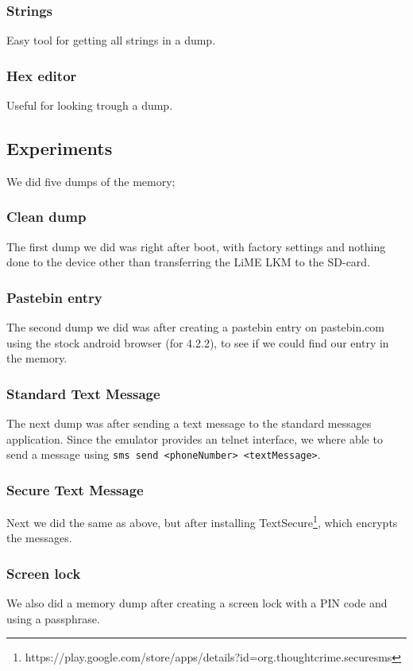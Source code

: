  \subsubsection{Strings}
  Easy tool for getting all strings in a dump.
  \subsubsection{Hex editor}
  Useful for looking trough a dump.
\subsection{Experiments}
We did five dumps of the memory;
  \subsubsection{Clean dump}
  The first dump we did was right after boot, with factory settings and nothing done to the device 
  other than transferring the LiME LKM to the SD-card.
  \subsubsection{Pastebin entry}
  The second dump we did was after creating a pastebin entry on pastebin.com using the stock android browser (for 4.2.2),
  to see if we could find our entry in the memory.
  \subsubsection{Standard Text Message}
  The next dump was after sending a text message to the standard messages application. Since the emulator provides an telnet 
  interface, we where able to send a message using \texttt{sms send <phoneNumber> <textMessage>}.
  \subsubsection{Secure Text Message}
  Next we did the same as above, but after installing 
  TextSecure\footnote{https://play.google.com/store/apps/details?id=org.thoughtcrime.securesms}, which encrypts the messages. 
  \subsubsection{Screen lock}
  We also did a memory dump after creating a screen lock with a PIN code and using a passphrase.

